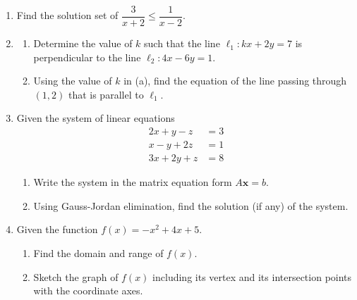 \documentclass[10pt,openany,a4paper]{article}
\theoremstyle{definition}
\theoremstyle{definition}
\theoremstyle{plain}
\begin{document}
\begin{enumerate}
    \item Find the solution set of $\dfrac{3}{x+2}\leq\dfrac{1}{x-2}$.

    \item \begin{enumerate}
        \item Determine the value of $k$ such that the line $\ell_1: kx+2y=7$ is perpendicular to the line $\ell_2: 4x-6y=1$.
        \item Using the value of $k$ in (a), find the equation of the line passing through $(1,2)$ that is parallel to $\ell_1$.
    \end{enumerate}

    \item Given the system of linear equations
    \begin{align*}
        2x+y-z &= 3\\
        x-y+2z &= 1\\
        3x+2y+z &= 8
    \end{align*}
    \begin{enumerate}
        \item Write the system in the matrix equation form $A\mathbf{x}=b$.
        \item Using Gauss-Jordan elimination, find the solution (if any) of the system.
    \end{enumerate}

    \item Given the function $f(x)=-x^2+4x+5$.
    \begin{enumerate}
        \item Find the domain and range of $f(x)$.
        \item Sketch the graph of $f(x)$ including its vertex and its intersection points with the coordinate axes.
    \end{enumerate}


\end{enumerate}
\end{document}
